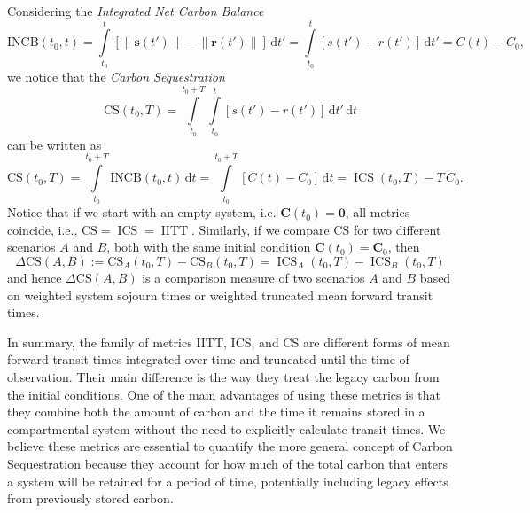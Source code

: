 \documentclass[9pt,twoside]{pnas-new}
\newcommand{\CS}{\mathrm{CS}}
\newcommand{\INCB}{\mathrm{INCB}}
\newcommand{\IITT}{\operatorname{IITT}}
\newcommand{\ICS}{\operatorname{ICS}}
\newcommand{\intl}{\int\limits}
\newcommand{\dd}[1]{\,\mathrm{d}#1}
\renewcommand{\vec}[1]{\mathbf{#1}}
\newcommand{\vnorm}[1]{\left\|#1\right\|}
\begin{document}
Considering the \emph{Integrated Net Carbon Balance}
\begin{equation}
    \INCB(t_0,t) = \intl_{t_0}^{t}\left[\vnorm{\vec{s}(t')}-\vnorm{\vec{r}(t')}\right]\dd{t'} = \intl_{t_0}^t \left[s(t')-r(t')\right]\dd{t'} = C(t)-C_0,
\end{equation}
we notice that the \emph{Carbon Sequestration}
\begin{equation}
    \CS(t_0,T) = \intl_{t_0}^{t_0+T} \intl_{t_0}^t \left[s(t')-r(t')\right]\dd{t'}\dd{t}
\end{equation}
can be written as
\begin{equation}
    \CS(t_0,T) = \intl_{t_0}^{t_0+T} \INCB(t_0,t)\dd{t} = \intl_{t_0}^{t_0+T} \left[C(t) - C_0\right]\dd{t} = \ICS(t_0,T) - T\,C_0.
\end{equation}
Notice that if we start with an empty system, i.e. $\vec{C}(t_0) = \vec{0}$, all metrics coincide, i.e.,  $\CS = \ICS = \IITT$. 
Similarly, if we compare $\CS$ for two different scenarios $A$ and $B$, both with the same initial condition $\vec{C}(t_0)=\vec{C}_0$, then
\begin{equation}
    \label{eqn:Delta_CS}
    \Delta\CS(A,B) := \CS_A(t_0,T) - \CS_B(t_0,T) = \ICS_A(t_0,T) - \ICS_B(t_0,T)
\end{equation}
and hence $\Delta\CS(A,B)$ is a comparison measure of two scenarios $A$ and $B$ based on weighted system sojourn times or weighted truncated mean forward transit times.

In summary, the family of metrics IITT, ICS, and CS are different forms of mean forward transit times integrated over time and truncated until the time of observation. Their main difference is the way they treat the legacy carbon from the initial conditions. One of the main advantages of using these metrics is that they combine both the amount of carbon and the time it remains stored in a compartmental system without the need to explicitly calculate transit times. We believe these metrics are essential to quantify the more general concept of Carbon Sequestration because they account for how much of the total carbon that enters a system will be retained for a period of time, potentially including legacy effects from previously stored carbon. 
\end{document}
